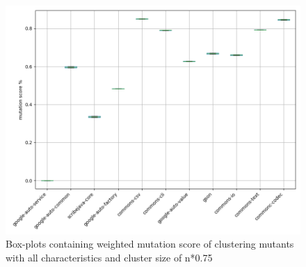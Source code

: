 \documentclass[../../main]{subfiles}
\begin{document}
\begin{figure}[H]
\includegraphics[width=\textwidth]{images/boxplot_summary/boxplot_hc_full_0.75.png}
\caption{\label{box:clustering_all_75}Box-plots containing weighted mutation score of clustering mutants with all characteristics and cluster size of n*0.75}
\end{figure}
\end{document}

